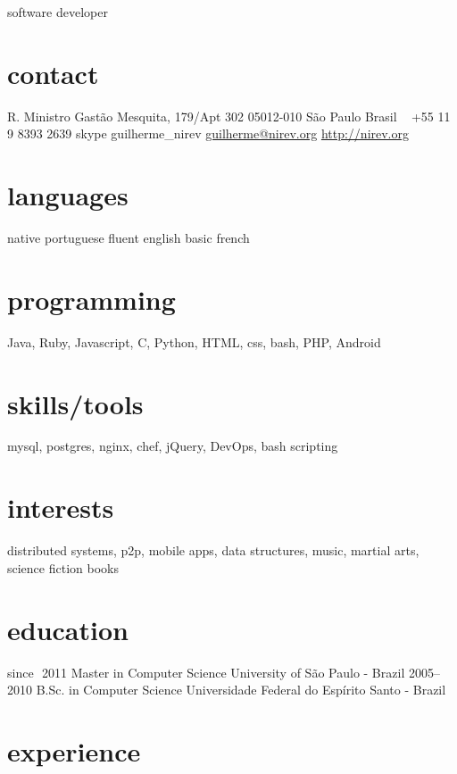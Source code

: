 \documentclass{friggeri-cv}
\begin{document}
       {software developer}


\begin{aside}
  \section{contact}
    R. Ministro Gastão Mesquita, 179/Apt 302
    05012-010 São Paulo
    Brasil
    ~
    +55 11 9 8393 2639
    {\footnotesize skype} guilherme\_nirev
    \href{mailto:guilherme@nirev.org}{guilherme@nirev.org}
    \href{http://nirev.org}{http://nirev.org}
  \section{languages}
    native portuguese
    fluent english
    basic french
  \section{programming}
    Java, Ruby, Javascript, C, Python,
    HTML, css, bash, PHP, Android
  \section{skills/tools}
    mysql, postgres,
    nginx, chef, jQuery, DevOps,
    bash scripting
  \section{interests}
distributed systems, p2p, mobile apps, data structures, music, martial arts, science fiction books
\end{aside}


\section{education}

\begin{entrylist}

\entry
  {since $\,\,$2011}
  {Master in Computer Science}
  {University of São Paulo - Brazil}{}
\entry
  {2005–2010}
  {B.Sc. in Computer Science}
  {Universidade Federal do Espírito Santo - Brazil}{}
\end{entrylist}

\section{experience}
\end{document}
